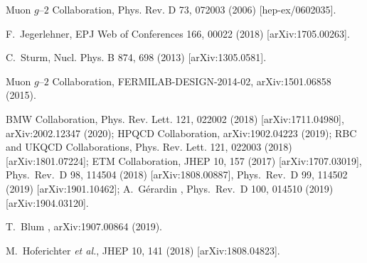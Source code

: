 \begin{thebibliography}{99}
             Muon $g$--$2$ Collaboration, 
                              Phys. Rev. D 73, 072003 (2006) [hep-ex/0602035].


           F.~Jegerlehner,
                                  EPJ Web of Conferences 166, 00022 (2018) [arXiv:1705.00263].

           C.~Sturm, Nucl. Phys. B 874, 698 (2013) [arXiv:1305.0581].

        Muon $g$--$2$ Collaboration, FERMILAB-DESIGN-2014-02,
                              arXiv:1501.06858 (2015).

      BMW Collaboration,
                              Phys. Rev. Lett. 121, 022002 (2018)
                              [arXiv:1711.04980], arXiv:2002.12347 (2020);
                          HPQCD Collaboration, arXiv:1902.04223 (2019);
                          RBC and UKQCD Collaborations, 
                                Phys. Rev. Lett. 121, 022003 (2018) [arXiv:1801.07224];
                          ETM Collaboration, JHEP 10, 157 (2017) [arXiv:1707.03019],
                          Phys.\ Rev.\ D 98, 114504 (2018) [arXiv:1808.00887], Phys.\ Rev.\ D 99, 114502 (2019) [arXiv:1901.10462];
                          A.~G\'erardin \ea, Phys.\ Rev.\ D 100, 014510 (2019) [arXiv:1904.03120].

     T.~Blum \ea, arXiv:1907.00864 (2019).
 
   M.~Hoferichter {\it et al.},
                JHEP 10, 141 (2018)
                [arXiv:1808.04823].
 
\end{thebibliography}  
